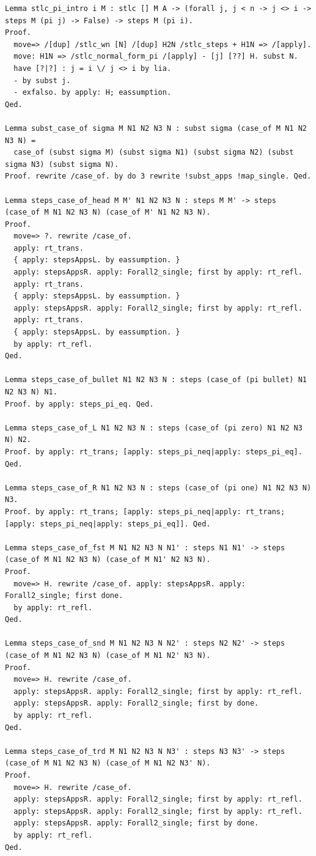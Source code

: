 \documentclass[10pt,a4paper]{amsart}
\begin{document}
\begin{lstlisting}
Lemma stlc_pi_intro i M : stlc [] M A -> (forall j, j < n -> j <> i -> steps M (pi j) -> False) -> steps M (pi i).
Proof.
  move=> /[dup] /stlc_wn [N] /[dup] H2N /stlc_steps + H1N => /[apply].
  move: H1N => /stlc_normal_form_pi /[apply] - [j] [??] H. subst N.
  have [?|?] : j = i \/ j <> i by lia.
  - by subst j.
  - exfalso. by apply: H; eassumption.
Qed.

Lemma subst_case_of sigma M N1 N2 N3 N : subst sigma (case_of M N1 N2 N3 N) =
  case_of (subst sigma M) (subst sigma N1) (subst sigma N2) (subst sigma N3) (subst sigma N).
Proof. rewrite /case_of. by do 3 rewrite !subst_apps !map_single. Qed.

Lemma steps_case_of_head M M' N1 N2 N3 N : steps M M' -> steps (case_of M N1 N2 N3 N) (case_of M' N1 N2 N3 N).
Proof.
  move=> ?. rewrite /case_of.
  apply: rt_trans.
  { apply: stepsAppsL. by eassumption. }
  apply: stepsAppsR. apply: Forall2_single; first by apply: rt_refl.
  apply: rt_trans.
  { apply: stepsAppsL. by eassumption. }
  apply: stepsAppsR. apply: Forall2_single; first by apply: rt_refl.
  apply: rt_trans.
  { apply: stepsAppsL. by eassumption. }
  by apply: rt_refl.
Qed.

Lemma steps_case_of_bullet N1 N2 N3 N : steps (case_of (pi bullet) N1 N2 N3 N) N1.
Proof. by apply: steps_pi_eq. Qed.

Lemma steps_case_of_L N1 N2 N3 N : steps (case_of (pi zero) N1 N2 N3 N) N2.
Proof. by apply: rt_trans; [apply: steps_pi_neq|apply: steps_pi_eq]. Qed.

Lemma steps_case_of_R N1 N2 N3 N : steps (case_of (pi one) N1 N2 N3 N) N3.
Proof. by apply: rt_trans; [apply: steps_pi_neq|apply: rt_trans; [apply: steps_pi_neq|apply: steps_pi_eq]]. Qed.

Lemma steps_case_of_fst M N1 N2 N3 N N1' : steps N1 N1' -> steps (case_of M N1 N2 N3 N) (case_of M N1' N2 N3 N).
Proof.
  move=> H. rewrite /case_of. apply: stepsAppsR. apply: Forall2_single; first done.
  by apply: rt_refl.
Qed.

Lemma steps_case_of_snd M N1 N2 N3 N N2' : steps N2 N2' -> steps (case_of M N1 N2 N3 N) (case_of M N1 N2' N3 N).
Proof.
  move=> H. rewrite /case_of.
  apply: stepsAppsR. apply: Forall2_single; first by apply: rt_refl.
  apply: stepsAppsR. apply: Forall2_single; first by done.
  by apply: rt_refl.
Qed.

Lemma steps_case_of_trd M N1 N2 N3 N N3' : steps N3 N3' -> steps (case_of M N1 N2 N3 N) (case_of M N1 N2 N3' N).
Proof.
  move=> H. rewrite /case_of.
  apply: stepsAppsR. apply: Forall2_single; first by apply: rt_refl.
  apply: stepsAppsR. apply: Forall2_single; first by apply: rt_refl.
  apply: stepsAppsR. apply: Forall2_single; first by done.
  by apply: rt_refl.
Qed.


\end{lstlisting}
\end{document}

